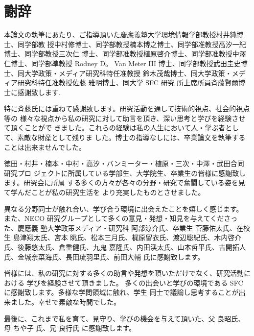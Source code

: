 \chapter*{謝辞}
\label{thanks}

本論文の執筆にあたり、ご指導頂いた慶應義塾大学環境情報学部教授村井純博士、同学部教
授中村修博士、同学部教授楠本博之博士、同学部准教授高汐一紀博士、同学部教授三次仁
博士、同学部准教授植原啓介博士、同学部准教授中澤仁博士、同学部準教授 Rodney D。
Van Meter III 博士、同学部教授武田圭史博士、同大学政策・メディア研究科特任准教授
鈴木茂哉博士、同大学政策・メディア研究科特任准教授佐藤 雅明博士、同大学 SFC 研究
所上席所員斉藤賢爾博士に感謝致します.

特に斉藤氏には重ねて感謝致します。研究活動を通して技術的視点、社会的視点等の
様々な視点から私の研究に対して助言を頂き、深い思考と学びを経験させて頂くことがで
きました。これらの経験は私の人生において人・学ぶ者として、素敵な財産として残りま
した。博士の指導なしには、卒業論文を執筆することは出来ませんでした。

徳田・村井・楠本・中村・高汐・バンミーター・植原・三次・中澤・武田合同研究プロ
ジェクトに所属している学部生、大学院生、卒業生の皆様に感謝致します。研究会に所属
する多くの方々が各々の分野・研究で奮闘している姿を見て学んだことが私の研究生活を
より充実したものとさせました。

異なる分野同士が触れ合い、学び合う環境に出会えたことを嬉しく感じます。
また、NECO 研究グループとして多くの意見・発想・知見を与えてくださった、慶應義
塾大学政策メディア・研究科 阿部涼介氏、卒業生 菅藤佑太氏、在校生 島津翔太氏、宮本
眺氏、松本三月氏、梶原留衣氏、渡辺聡紀氏、木内啓介氏、後藤悠太氏、倉重健氏、九鬼
嘉隆氏、内田渓太氏、山本哲平氏、吉開拓人氏、金城奈菜海氏、長田琉羽里氏、前田大輔
氏に感謝致します。

皆様には、私の研究に対する多くの助言や発想を頂いただけでなく、研究活動における
学びを経験させて頂きました。
多くの出会いと学びの環境である SFC に感謝致します。多様な学問領域に触れ、学生
同士で議論し思考することが出来ました。幸せで素敵な時間でした。

最後に、これまで私を育て、見守り、学びの機会を与えて頂いた、父 良昭氏、母 ちや子
氏、兄 良行氏 に感謝致します。




